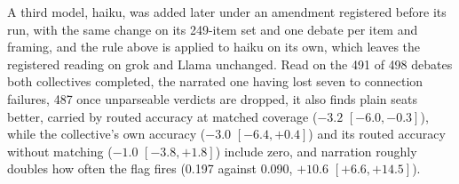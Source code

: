 A third model, haiku, was added later under an amendment registered
before its run, with the same change on its 249-item set and
one debate per item and framing, and the rule above is applied to haiku on
its own, which leaves the registered reading on grok and Llama unchanged.
Read on the 491 of 498 debates both collectives completed, the narrated one
having lost seven to connection failures, 487 once
unparseable verdicts are dropped, it also finds plain seats better, carried
by routed accuracy at matched coverage ($-3.2$ $[-6.0, -0.3]$), while the
collective's own accuracy ($-3.0$ $[-6.4, +0.4]$) and its routed accuracy
without matching ($-1.0$ $[-3.8, +1.8]$) include zero, and narration
roughly doubles how often the flag fires (0.197 against 0.090, $+10.6$
$[+6.6, +14.5]$).
